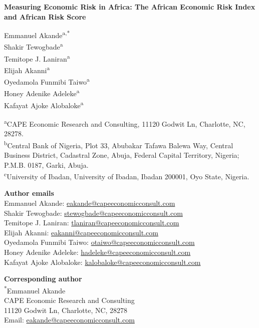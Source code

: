 \documentclass[12pt]{article}
\begin{document}
\begin{center}
{\Large\bfseries Measuring Economic Risk in Africa: The African Economic Risk Index and African Risk Score\par}
\vspace{0.7cm}
Emmanuel Akande\textsuperscript{a,*}\\
Shakir Tewogbade\textsuperscript{a}\\
Temitope J. Laniran\textsuperscript{a}\\
Elijah Akanni\textsuperscript{a}\\
Oyedamola Funmibi Taiwo\textsuperscript{a}\\
Honey Adenike Adeleke\textsuperscript{a}\\
Kafayat Ajoke Alobaloke\textsuperscript{a}
\end{center}
\vspace{0.4cm}
\textsuperscript{a}CAPE Economic Research and Consulting, 11120 Godwit Ln, Charlotte, NC, 28278.\\
\textsuperscript{b}Central Bank of Nigeria, Plot 33, Abubakar Tafawa Balewa Way, Central Business District, Cadastral Zone, Abuja, Federal Capital Territory, Nigeria; P.M.B. 0187, Garki, Abuja.\\
\textsuperscript{c}University of Ibadan, University of Ibadan, Ibadan 200001, Oyo State, Nigeria.

\textbf{Author emails}\\
Emmanuel Akande: \href{mailto:eakande@capeeconomicconsult.com}{eakande@capeeconomicconsult.com}\\
Shakir Tewogbade: \href{mailto:stewogbade@capeeconomicconsult.com}{stewogbade@capeeconomicconsult.com}\\
Temitope J. Laniran: \href{mailto:tlaniran@capeeconomicconsult.com}{tlaniran@capeeconomicconsult.com}\\
Elijah Akanni: \href{mailto:eakanni@capeeconomicconsult.com}{eakanni@capeeconomicconsult.com}\\
Oyedamola Funmibi Taiwo: \href{mailto:otaiwo@capeeconomicconsult.com}{otaiwo@capeeconomicconsult.com}\\
Honey Adenike Adeleke: \href{mailto:hadeleke@capeeconomicconsult.com}{hadeleke@capeeconomicconsult.com}\\
Kafayat Ajoke Alobaloke: \href{mailto:kalobaloke@capeeconomicconsult.com}{kalobaloke@capeeconomicconsult.com}

\textbf{Corresponding author}\\
\textsuperscript{*}Emmanuel Akande\\
CAPE Economic Research and Consulting\\
11120 Godwit Ln, Charlotte, NC, 28278\\
Email: \href{mailto:eakande@capeeconomicconsult.com}{eakande@capeeconomicconsult.com}
\end{document}
